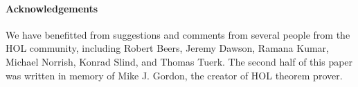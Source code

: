 

\paragraph{Acknowledgements}

We have benefitted from suggestions and comments 
from several people from the HOL
community, including Robert Beers, Jeremy Dawson,
Ramana Kumar,
Michael Norrish, 
Konrad Slind, and
Thomas Tuerk.
%
The second half of this
paper was written in memory of Mike J. Gordon, the creator of HOL theorem prover.
